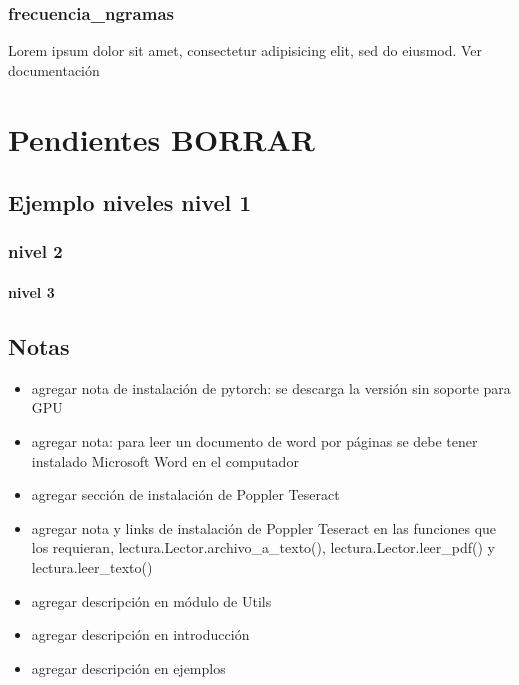 \documentclass[letterpaper,10pt,openany,spanish]{sphinxmanual}
\begin{document}
\subsection{frecuencia\_ngramas}
\label{\detokenize{seccion_ejemplos:frecuencia-ngramas}}
Lorem ipsum dolor sit amet, consectetur adipisicing elit, sed do eiusmod. Ver documentación {\hyperref[\detokenize{funciones/exploracion:exploracion.frecuencia_ngramas}]{}}


\chapter{Pendientes \sphinxhyphen{} BORRAR}
\label{\detokenize{pendientes_borrar:pendientes-borrar}}\label{\detokenize{pendientes_borrar:id1}}\label{\detokenize{pendientes_borrar::doc}}

\section{Ejemplo niveles \sphinxhyphen{} nivel 1}
\label{\detokenize{pendientes_borrar:ejemplo-niveles-nivel-1}}

\subsection{nivel 2}
\label{\detokenize{pendientes_borrar:nivel-2}}

\subsubsection{nivel 3}
\label{\detokenize{pendientes_borrar:nivel-3}}

\section{Notas}
\label{\detokenize{pendientes_borrar:notas}}\begin{itemize}
\item {} 
agregar nota de instalación de pytorch: se descarga la versión sin soporte para GPU

\item {} 
agregar nota: para leer un documento de word por páginas se debe tener instalado Microsoft Word en el computador

\item {} 
agregar sección de instalación de Poppler \sphinxhyphen{} Teseract

\item {} 
agregar nota y links de instalación de Poppler \sphinxhyphen{} Teseract en las funciones que los requieran, lectura.Lector.archivo\_a\_texto(), lectura.Lector.leer\_pdf() y lectura.leer\_texto()

\item {} 
agregar descripción en módulo de Utils

\item {} 
agregar descripción en introducción

\item {} 
agregar descripción en ejemplos

\end{itemize}
\end{document}
